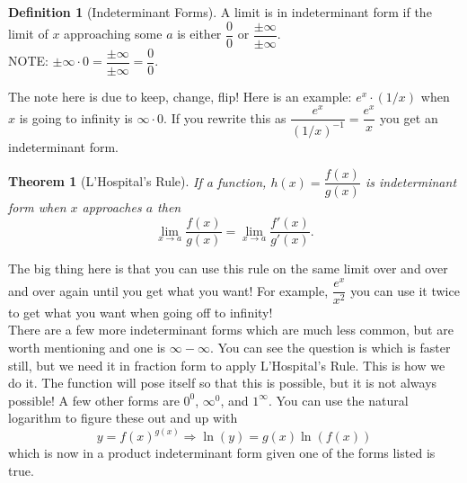 \documentclass[10pt]{article}
\theoremstyle{Theorem}
\newtheorem{theorem}{Theorem}[section]
\theoremstyle{definition}
\newtheorem{definition}{Definition}[section]
\theoremstyle{remark}
\theoremstyle{custom}
\begin{document}
\begin{definition}[Indeterminant Forms]
A limit is in indeterminant form if the limit of $x$ approaching some $a$ is either $\dfrac{0}{0}$ or $\dfrac{\pm\infty}{\pm\infty}$.\\
NOTE: $\pm\infty \cdot 0=\dfrac{\pm\infty}{\pm\infty}=\dfrac{0}{0}$.
\end{definition}
The note here is due to keep, change, flip! Here is an example: $e^x\cdot (1/x)$ when $x$ is going to infinity is $\infty \cdot 0$. If you rewrite this as $\dfrac{e^x}{(1/x)^{-1}}=\dfrac{e^x}{x}$ you get an indeterminant form.
\begin{theorem}[L'Hospital's Rule]
If a function, $h(x)=\dfrac{f(x)}{g(x)}$ is indeterminant form when $x$ approaches $a$ then
\[ 
\lim_{x\rightarrow a}\dfrac{f(x)}{g(x)}=\lim_{x\rightarrow a}\dfrac{f'(x)}{g'(x)}.
\]
\end{theorem}
The big thing here is that you can use this rule on the same limit over and over and over again until you get what you want! For example, $\dfrac{e^x}{x^2}$ you can use it twice to get what you want when going off to infinity!\\
There are a few more indeterminant forms which are much less common, but are worth mentioning and one is $\infty - \infty$. You can see the question is which is faster still, but we need it in fraction form to apply L'Hospital's Rule. This is how we do it. The function will pose itself so that this is possible, but it is not always possible! A few other forms are $0^0$, $\infty^0$, and $1^\infty$. You can use the natural logarithm to figure these out and up with
\[
y=f(x)^{g(x)} \Rightarrow \ln(y)=g(x)\ln(f(x))
\]
which is now in a product indeterminant form given one of the forms listed is true.
\end{document}
